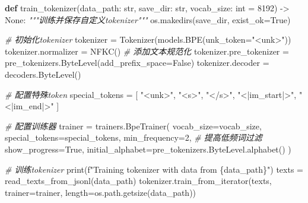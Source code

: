 \documentclass[
]{article}
\newenvironment{Shaded}{}{}
\newcommand{\BuiltInTok}[1]{\textcolor[rgb]{0.00,0.50,0.00}{#1}}
\newcommand{\CommentTok}[1]{\textcolor[rgb]{0.38,0.63,0.69}{\textit{#1}}}
\newcommand{\DecValTok}[1]{\textcolor[rgb]{0.25,0.63,0.44}{#1}}
\newcommand{\KeywordTok}[1]{\textcolor[rgb]{0.00,0.44,0.13}{\textbf{#1}}}
\newcommand{\NormalTok}[1]{#1}
\newcommand{\OperatorTok}[1]{\textcolor[rgb]{0.40,0.40,0.40}{#1}}
\newcommand{\SpecialCharTok}[1]{\textcolor[rgb]{0.25,0.44,0.63}{#1}}
\newcommand{\SpecialStringTok}[1]{\textcolor[rgb]{0.73,0.40,0.53}{#1}}
\newcommand{\StringTok}[1]{\textcolor[rgb]{0.25,0.44,0.63}{#1}}
\newcommand{\VariableTok}[1]{\textcolor[rgb]{0.10,0.09,0.49}{#1}}
\begin{document}
\begin{Shaded}
\begin{Highlighting}[]
\KeywordTok{def}\NormalTok{ train\_tokenizer(data\_path: }\BuiltInTok{str}\NormalTok{, save\_dir: }\BuiltInTok{str}\NormalTok{, vocab\_size: }\BuiltInTok{int} \OperatorTok{=} \DecValTok{8192}\NormalTok{) }\OperatorTok{{-}\textgreater{}} \VariableTok{None}\NormalTok{:}
    \CommentTok{"""训练并保存自定义tokenizer"""}
\NormalTok{    os.makedirs(save\_dir, exist\_ok}\OperatorTok{=}\VariableTok{True}\NormalTok{)}
    
    \CommentTok{\# 初始化tokenizer}
\NormalTok{    tokenizer }\OperatorTok{=}\NormalTok{ Tokenizer(models.BPE(unk\_token}\OperatorTok{=}\StringTok{"\textless{}unk\textgreater{}"}\NormalTok{))}
\NormalTok{    tokenizer.normalizer }\OperatorTok{=}\NormalTok{ NFKC()  }\CommentTok{\# 添加文本规范化}
\NormalTok{    tokenizer.pre\_tokenizer }\OperatorTok{=}\NormalTok{ pre\_tokenizers.ByteLevel(add\_prefix\_space}\OperatorTok{=}\VariableTok{False}\NormalTok{)}
\NormalTok{    tokenizer.decoder }\OperatorTok{=}\NormalTok{ decoders.ByteLevel()}

    \CommentTok{\# 配置特殊token}
\NormalTok{    special\_tokens }\OperatorTok{=}\NormalTok{ [}
        \StringTok{"\textless{}unk\textgreater{}"}\NormalTok{, }
        \StringTok{"\textless{}s\textgreater{}"}\NormalTok{, }
        \StringTok{"\textless{}/s\textgreater{}"}\NormalTok{, }
        \StringTok{"\textless{}|im\_start|\textgreater{}"}\NormalTok{, }
        \StringTok{"\textless{}|im\_end|\textgreater{}"}
\NormalTok{    ]}

    \CommentTok{\# 配置训练器}
\NormalTok{    trainer }\OperatorTok{=}\NormalTok{ trainers.BpeTrainer(}
\NormalTok{        vocab\_size}\OperatorTok{=}\NormalTok{vocab\_size,}
\NormalTok{        special\_tokens}\OperatorTok{=}\NormalTok{special\_tokens,}
\NormalTok{        min\_frequency}\OperatorTok{=}\DecValTok{2}\NormalTok{,  }\CommentTok{\# 提高低频词过滤}
\NormalTok{        show\_progress}\OperatorTok{=}\VariableTok{True}\NormalTok{,}
\NormalTok{        initial\_alphabet}\OperatorTok{=}\NormalTok{pre\_tokenizers.ByteLevel.alphabet()}
\NormalTok{    )}

    \CommentTok{\# 训练tokenizer}
    \BuiltInTok{print}\NormalTok{(}\SpecialStringTok{f"Training tokenizer with data from }\SpecialCharTok{\{}\NormalTok{data\_path}\SpecialCharTok{\}}\SpecialStringTok{"}\NormalTok{)}
\NormalTok{    texts }\OperatorTok{=}\NormalTok{ read\_texts\_from\_jsonl(data\_path)}
\NormalTok{    tokenizer.train\_from\_iterator(texts, trainer}\OperatorTok{=}\NormalTok{trainer, length}\OperatorTok{=}\NormalTok{os.path.getsize(data\_path))}


\end{Highlighting}
\end{Shaded}
\end{document}
